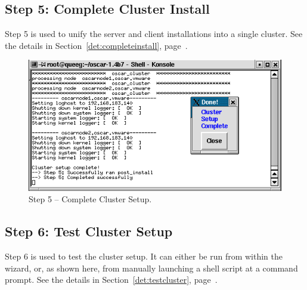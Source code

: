 \clearpage
\subsection{Step 5: Complete Cluster Install} 

Step 5 is used to unify the server and client installations into a
single cluster.  See the details in Section~\ref{det:completeinstall},
page~\pageref{det:completeinstall}.

\begin{figure}[h!]
   \begin{center}
     \centerline{\includegraphics[scale=\imgscale]{figs/7_sbs-complete-cluster-setup}}
     \caption{Step 5 -- Complete Cluster Setup.}
     \label{fig:sbs-install-wizard-s5}
   \end{center}
 \end{figure}



\subsection{Step 6: Test Cluster Setup}

Step 6 is used to test the cluster setup.  It can either be run from
within the wizard, or, as shown here, from manually launching a shell
script at a  command prompt.  See the details in
Section~\ref{det:testcluster}, page~\pageref{det:testcluster}.

